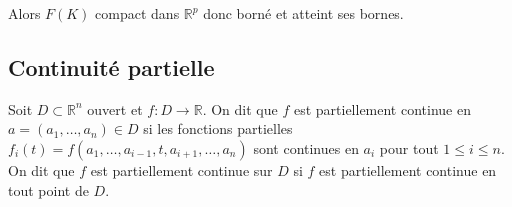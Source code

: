 \documentclass[oneside]{book}
\begin{document}
\begin{remark}
Alors $F(K)$ compact dans $\mathbb{R}^p$ donc borné et atteint ses bornes.
\end{remark}

\subsection{Continuité partielle}

\begin{definition}
Soit $D \subset \mathbb{R}^n$ ouvert et $f: D \rightarrow \mathbb{R}$. On dit que $f$ est partiellement continue en $a = (a_1, \ldots, a_n) \in D$ si les fonctions partielles $f_i(t) = f(a_1, \ldots, a_{i-1}, t, a_{i+1}, \ldots, a_n)$ sont continues en $a_i$ pour tout $1 \leq i \leq n$.
On dit que $f$ est partiellement continue sur $D$ si $f$ est partiellement continue en tout point de $D$.
\end{definition}
\end{document}
